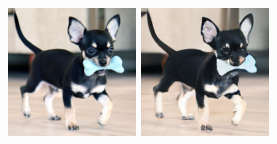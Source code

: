 \begin{figure}[h]
    \begin{minipage}{0.15\textwidth}
        \centering
        \includegraphics[width=\linewidth]{material/origin/118.png}
    \end{minipage}
    \begin{minipage}{0.15\textwidth}
        \centering
        \includegraphics[width=\linewidth]{material/vq/118.png}

\end{minipage}
\end{figure}
